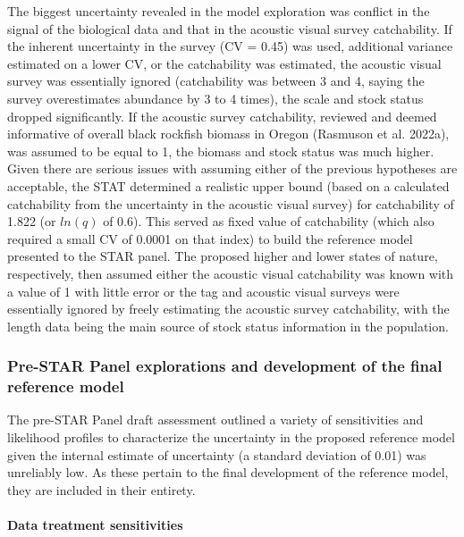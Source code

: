 \documentclass[11pt,
  letterpaper,
]{article}
\begin{document}
The biggest uncertainty revealed in the model exploration was conflict in the signal of the biological data and that in the acoustic visual survey catchability. If the inherent uncertainty in the survey (CV = 0.45) was used, additional variance estimated on a lower CV, or the catchability was estimated, the acoustic visual survey was essentially ignored (catchability was between 3 and 4, saying the survey overestimates abundance by 3 to 4 times), the scale and stock status dropped significantly. If the acoustic survey catchability, reviewed and deemed informative of overall black rockfish biomass in Oregon (Rasmuson et al. 2022a), was assumed to be equal to 1, the biomass and stock status was much higher. Given there are serious issues with assuming either of the previous hypotheses are acceptable, the STAT determined a realistic upper bound (based on a calculated catchability from the uncertainty in the acoustic visual survey) for catchability of 1.822 (or \(ln(q)\) of 0.6). This served as fixed value of catchability (which also required a small CV of 0.0001 on that index) to build the reference model presented to the STAR panel. The proposed higher and lower states of nature, respectively, then assumed either the acoustic visual catchability was known with a value of 1 with little error or the tag and acoustic visual surveys were essentially ignored by freely estimating the acoustic survey catchability, with the length data being the main source of stock status information in the population.

\hypertarget{pre-star-panel-explorations-and-development-of-the-final-reference-model}{%
\subsubsection{Pre-STAR Panel explorations and development of the final reference model}\label{pre-star-panel-explorations-and-development-of-the-final-reference-model}}

The pre-STAR Panel draft assessment outlined a variety of sensitivities and likelihood profiles to characterize the uncertainty in the proposed reference model given the internal estimate of uncertainty (a standard deviation of 0.01) was unreliably low. As these pertain to the final development of the reference model, they are included in their entirety.

\hypertarget{data-treatment-sensitivities}{%
\paragraph{Data treatment sensitivities}\label{data-treatment-sensitivities}}
\end{document}

